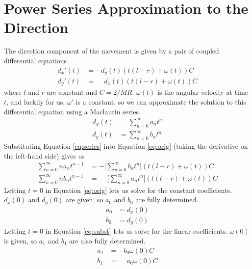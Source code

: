 \documentclass{report}
\begin{document}
\section{Power Series Approximation to the Direction}
The direction component of the movement is given by a pair of
coupled differential equations
\begin{equation} \label{eq:orig}
    \begin{aligned}
    d_x'(t) &= -d_y(t)(t(l-r)+\omega(t)) C\\
    d_y'(t) &= \phantom{-}d_x(t)(t(l-r)+\omega(t)) C
    \end{aligned}
\end{equation}
where $l$ and $r$ are constant and $C = 2/MR$. $\omega(t)$ is the angular velocity at time $t$, and
luckily for us, $\omega'$ is a constant, so we can approximate
the solution to this differential equation using a Maclaurin series.
\begin{equation} \label{eq:series}
    \begin{aligned}
    d_x(t) &= \sum_{n=0}^\infty a_n t^n \\
    d_y(t) &= \sum_{n=0}^\infty b_n t^n
    \end{aligned}
\end{equation}
Substituting Equation \ref{eq:series} into Equation \ref{eq:orig}
(taking the derivative on the left-hand side) gives us
\begin{equation} \label{eq:subst}
    \begin{aligned}
    \sum_{n=0}^\infty n a_n t^{n-1} &=
        -\Bigg[\sum_{n=0}^\infty b_n t^n \Bigg]
        (t(l-r)+\omega(t)) C \\
    \sum_{n=0}^\infty n b_n t^{n-1} &=
        \phantom{-}\Bigg[\sum_{n=0}^\infty a_n t^n \Bigg]
        (t(l-r)+\omega(t)) C
    \end{aligned}
\end{equation}
Letting $t=0$ in Equation \ref{eq:orig} lets us solve for the constant coefficients. $d_x(0)$ and $d_y(0)$ are given,
so $a_0$ and $b_0$ are fully determined.
\begin{equation} \label{eq:coeff0}
    \begin{aligned}
        a_0 &= d_x(0) \\
        b_0 &= d_y(0)
    \end{aligned}
\end{equation}
Letting $t=0$ in
Equation \ref{eq:subst} lets us solve for the linear coefficients. $\omega(0)$ is given, so $a_1$ and $b_1$ are also
fully determined.
\begin{equation} \label{eq:coeff1}
    \begin{aligned}
    a_1 &= -b_0\omega(0)C \\
    b_1 &= \phantom{-}a_0\omega(0)C
    \end{aligned}
\end{equation}
\end{document}
